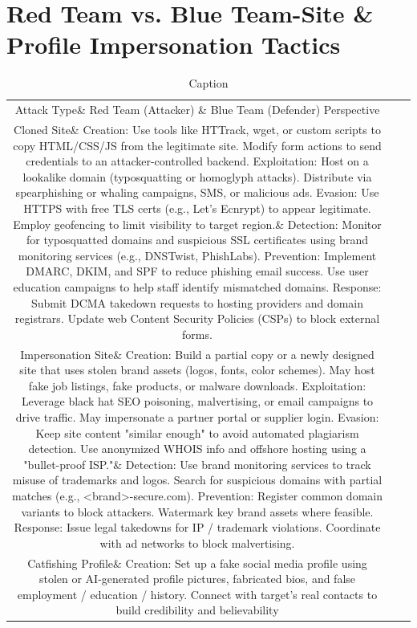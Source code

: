 \section{Red Team vs. Blue Team-Site \& Profile Impersonation Tactics}

\begin{table}
    \centering
    \begin{tabular}{ccc}
         Attack Type\&  Red Team (Attacker) \& Blue Team (Defender) Perspective\\
         Cloned Site\&  Creation: Use tools like HTTrack, wget, or custom scripts to copy HTML/CSS/JS from the legitimate site. Modify form actions to send credentials to an attacker-controlled backend.
Exploitation: Host on a lookalike domain (typosquatting or homoglyph attacks). Distribute via spearphishing or whaling campaigns, SMS, or malicious ads.
Evasion: Use HTTPS with free TLS certs (e.g., Let's Ecnrypt) to appear legitimate. Employ geofencing to limit visibility to target region.\& Detection: Monitor for typosquatted domains and suspicious SSL certificates using brand monitoring services (e.g., DNSTwist, PhishLabs).
Prevention: Implement DMARC, DKIM, and SPF to reduce phishing email success. Use user education campaigns to help staff identify mismatched domains.
Response: Submit DCMA takedown requests to hosting providers and domain registrars. Update web Content Security Policies (CSPs) to block external forms.\\
         Impersonation Site\&  Creation: Build a partial copy or a newly designed site that uses stolen brand assets (logos, fonts, color schemes). May host fake job listings, fake products, or malware downloads.
Exploitation: Leverage black hat SEO poisoning, malvertising, or email campaigns to drive traffic. May impersonate a partner portal or supplier login.
Evasion: Keep site content "similar enough" to avoid automated plagiarism detection. Use anonymized WHOIS info and offshore hosting using a "bullet-proof ISP."\& Detection: Use brand monitoring services to track misuse of trademarks and logos. Search for suspicious domains with partial matches (e.g., <brand>-secure.com).
Prevention: Register common domain variants to block attackers. Watermark key brand assets where feasible.
Response: Issue legal takedowns for IP / trademark violations. Coordinate with ad networks to block malvertising.\\
         Catfishing Profile\&  Creation: Set up a fake social media profile using stolen or AI-generated profile pictures, fabricated bios, and false employment / education / history. Connect with target's real contacts to build credibility and believability& \\
    \end{tabular}
    \caption{Caption}
    \label{tab:placeholder2}
\end{table}



